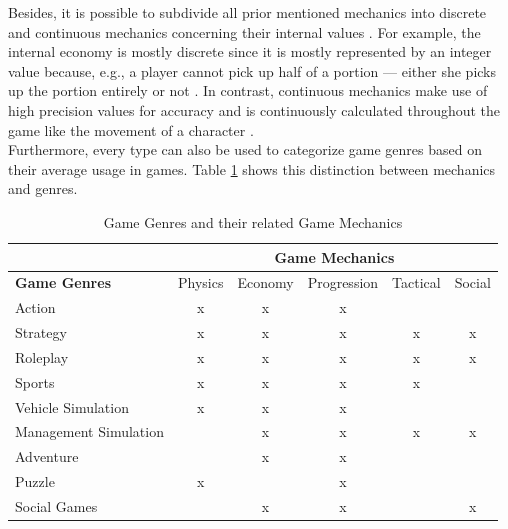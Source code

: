 \documentclass[MGS,Master,english]{twbook}%
\begin{document}
Besides, it is possible to subdivide all prior mentioned mechanics into discrete and continuous mechanics concerning their internal values \cite{gameDesign::gameMechanicsAdvancedGameDesign}. For example, the internal economy is mostly discrete since it is mostly represented by an integer value because, e.g., a player cannot pick up half of a portion — either she picks up the portion entirely or not \cite{gameDesign::gameMechanicsAdvancedGameDesign}. In contrast, continuous mechanics make use of high precision values for accuracy and is continuously calculated throughout the game like the movement of a character \cite{gameDesign::gameMechanicsAdvancedGameDesign}. \\
Furthermore, every type can also be used to categorize game genres based on their average usage in games. Table \ref{GameMechanicsToGenre} shows this distinction between mechanics and genres.
\begin{table}[!htbp]
	\centering
	{%
		\begin{tabular}{l||c|c|c|c|c|}
			\cline{2-6}
			& \multicolumn{5}{c|}{\textbf{Game Mechanics}}        \\ \hline 
			\multicolumn{1}{|l||}{\textbf{Game Genres}}  & Physics & Economy & Progression & Tactical & Social \\ \hline \hline
			\multicolumn{1}{|l||}{Action}                & x       & x       & x           &          &        \\ \hline
			\multicolumn{1}{|l||}{Strategy}              & x       & x       & x           & x        & x      \\ \hline
			\multicolumn{1}{|l||}{Roleplay}              & x       & x       & x           & x        & x      \\ \hline
			\multicolumn{1}{|l||}{Sports}                & x       & x       & x           & x        &        \\ \hline
			\multicolumn{1}{|l||}{Vehicle Simulation}    & x       & x       & x           &          &        \\ \hline
			\multicolumn{1}{|l||}{Management Simulation} &         & x       & x           & x        & x      \\ \hline
			\multicolumn{1}{|l||}{Adventure}             &         & x       & x           &          &        \\ \hline
			\multicolumn{1}{|l||}{Puzzle}                & x       &         & x           &          &        \\ \hline
			\multicolumn{1}{|l||}{Social Games}          &         & x       & x           &          & x      \\ \hline
		\end{tabular}%
	}
	\caption{Game Genres and their related Game Mechanics \protect\cite{gameDesign::gameMechanicsAdvancedGameDesign}}
	\label{GameMechanicsToGenre}
\end{table}\\
\end{document}
